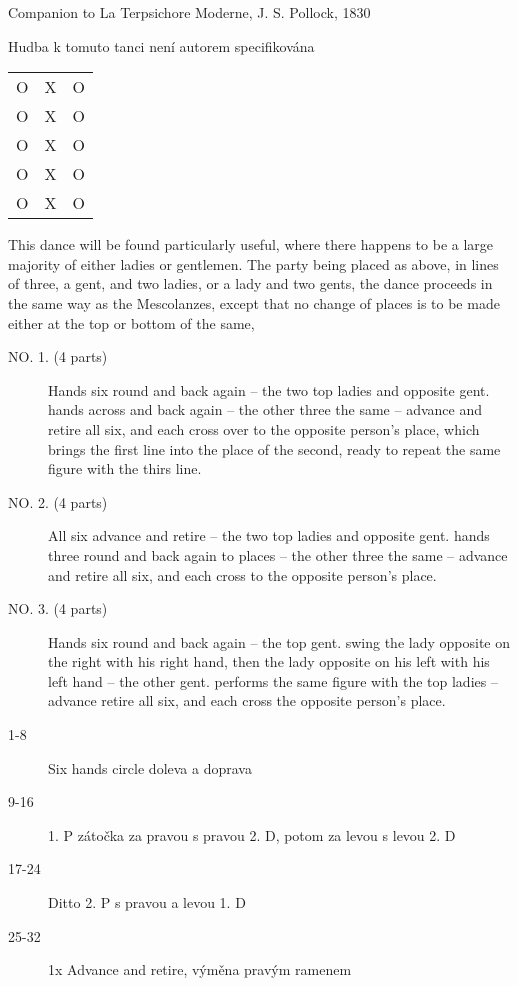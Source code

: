 {\large\hfill Companion to La Terpsichore Moderne, J. S. Pollock, 1830}
\begin{center}
{\large Hudba k tomuto tanci není autorem specifikována}
\end{center}
\vspace{1em}
\HRule
\vspace{0.5em}
\begin{multicols}{2}
\begin{center}
\begin{tabular}{ c c c }
 O & X & O \\ 
 O & X & O \\ 
 O & X & O \\ 
 O & X & O \\ 
 O & X & O
\end{tabular}
\end{center}
This dance will be found particularly useful, where there happens to be a large majority of either ladies or gentlemen. The party being placed as above, in lines of three, a gent, and two ladies, or a lady and two gents, the dance proceeds in the same way as the Mescolanzes, except that no change of places is to be made either at the top or bottom of the same,

\columnbreak

\begin{description}
    \item[NO. 1. (4 parts)] Hands six round and back again -- the two top ladies and opposite gent. hands across and back again -- the other three the same -- advance and retire all six, and each cross over to the opposite person's place, which brings the first line into the place of the second, ready to repeat the same figure with the thirs line.
    \item[NO. 2. (4 parts)] All six advance and retire -- the two top ladies and opposite gent. hands three round and back again to places -- the other three the same -- advance and retire all six, and each cross to the opposite person's place.
    \item[NO. 3. (4 parts)] Hands six round and back again -- the top gent. swing the lady opposite on the right with his right hand, then the lady opposite on his left with his left hand -- the other gent. performs the same figure with the top ladies -- advance retire all six, and each cross the opposite person's place.
\end{description}
\end{multicols}
\vspace{1.5em}
\HRule
\HRule

\vspace{1.5em}
\begin{description}
    \item[1-8] Six hands circle doleva a doprava
    \item[9-16] 1. P zátočka za pravou s pravou 2. D, potom za levou s levou 2. D
    \item[17-24] Ditto 2. P s pravou a levou 1. D
    \item [25-32] 1x Advance and retire, výměna pravým ramenem
\end{description}